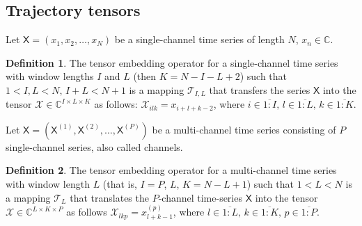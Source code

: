 \documentclass[12pt]{article}
\newcommand{\tX}{\mathsf{X}}
\newcommand{\calX}{\mathcal{X}}
\newcommand{\calT}{\mathcal{T}}
\theoremstyle{definition}
\newtheorem{definition}{Definition}
\begin{document}
\subsection{Trajectory tensors}
Let $\tX = (x_1, x_2, \ldots, x_N)$ be a single-channel time series
of length $N$, $x_n \in \mathbb{C}$.
\begin{definition}
  The tensor embedding operator for a single-channel time series with
  window lengths $I$ and $L$ (then $K=N-I-L+2$) such that ${1< I,L < N},\, {I + L < N + 1}$
  is a mapping $\calT_{I,L}$ that transfers the series
  $\tX$ into the tensor $\calX \in \mathbb{C}^{I\times L \times K}$
  as follows: ${\mathcal{X}_{ilk}=x_{i+l+k-2}}$, where
  $i\in \overline{1:I},\, l \in\overline{1:L},\, k \in\overline{1:K}$.
\end{definition}

Let $\tX = (\tX^{(1)}, \tX^{(2)}, \ldots, \tX^{(P)})$ be a multi-channel
time series consisting of $P$ single-channel series, also called channels.
\begin{definition}
  The tensor embedding operator for a multi-channel time series with
  window length $L$ (that is, $I=P$, $L$, $K=N-L+1$) such that ${1< L < N}$ is a mapping $\calT_{L}$
  that translates the
  $P$-channel time-series $\tX$ into the tensor $\calX \in
  \mathbb{C}^{L\times K \times P}$ as follows
  $\mathcal{X}_{lkp} =  x_{l+k-1}^{(p)}$, where ${l \in
  \overline{1:L}},\, {k \in \overline{1:K}},\, {p \in \overline{1:P}}$.
\end{definition}
\end{document}
